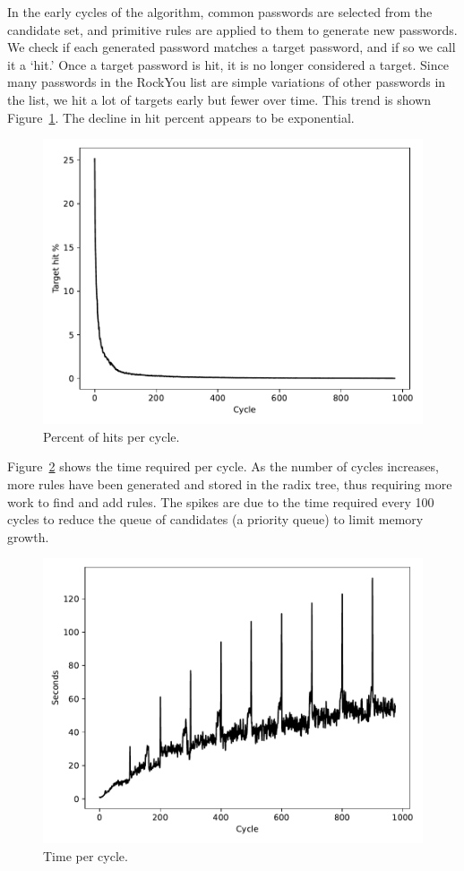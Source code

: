 \documentclass{article}
\begin{document}
In the early cycles of the algorithm, common passwords are selected from the
candidate set, and primitive rules are applied to them to generate new
passwords. We check if each generated password matches a target password, and
if so we call it a `hit.' Once a target password is hit, it is no longer
considered a target. Since many passwords in the RockYou list are simple
variations of other passwords in the list, we hit a lot of targets early but
fewer over time. This trend is shown Figure~\ref{fig:hitpct}. The decline in
hit percent appears to be exponential.

\begin{figure}[h!]
\centering
\includegraphics[width=0.7\linewidth]
{figures/stats-hitpct.pdf}
\caption{Percent of hits per cycle.}
\label{fig:hitpct}
\end{figure}

Figure~\ref{fig:seconds} shows the time required per cycle. As the number of
cycles increases, more rules have been generated and stored in the radix tree,
thus requiring more work to find and add rules. The spikes are due to the time
required every 100 cycles to reduce the queue of candidates (a priority queue)
to limit memory growth.

\begin{figure}[ht!]
\centering
\includegraphics[width=0.7\linewidth]
{figures/stats-seconds.pdf}
\caption{Time per cycle.}
\label{fig:seconds}
\end{figure}
\end{document}
